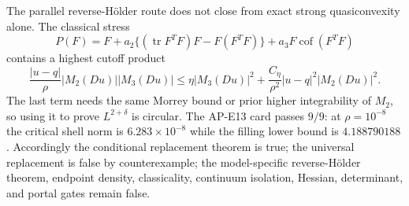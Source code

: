 The parallel reverse-H\"older route does not close from exact strong
quasiconvexity alone.  The classical stress
\begin{equation}
 P(F)=F+a_2\{(\operatorname{tr}F^TF)F-F(F^TF)\}
       +a_3F\operatorname{cof}(F^TF)
 \label{eq:e13-stress}
\end{equation}
contains a highest cutoff product
\begin{equation}
 \frac{|u-q|}{\rho}|M_2(Du)||M_3(Du)|
 \leq\eta|M_3(Du)|^2
 +\frac{C_\eta}{\rho^2}|u-q|^2|M_2(Du)|^2.
 \label{eq:e13-cutoff}
\end{equation}
The last term needs the same Morrey bound or prior higher integrability of
$M_2$, so using it to prove $L^{2+\delta}$ is circular.  The AP-E13 card
passes $9/9$: at $\rho=10^{-8}$ the critical shell norm is
$6.283\times10^{-8}$ while the filling lower bound is $4.188790188$.
Accordingly the conditional replacement theorem is true; the universal
replacement is false by counterexample; the model-specific reverse-H\"older
theorem, endpoint density, classicality, continuum isolation, Hessian,
determinant, and portal gates remain false.
